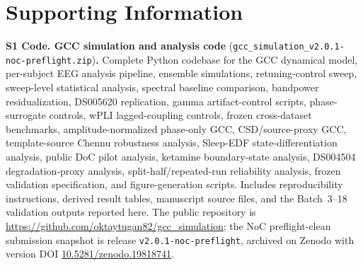 \documentclass[11pt,a4paper]{article}
\theoremstyle{plain}
\theoremstyle{definition}
\theoremstyle{remark}
\begin{document}

\section*{Supporting Information}

\noindent\textbf{S1 Code. GCC simulation and analysis code} (\texttt{gcc\_simulation\_v2.0.1-noc-preflight.zip})\textbf{.} Complete Python codebase for the GCC dynamical model, per-subject EEG analysis pipeline, ensemble simulations, retuning-control sweep, sweep-level statistical analysis, spectral baseline comparison, bandpower residualization, DS005620 replication, gamma artifact-control scripts, phase-surrogate controls, wPLI lagged-coupling controls, frozen cross-dataset benchmarks, amplitude-normalized phase-only GCC, CSD/source-proxy GCC, template-source Chennu robustness analysis, Sleep-EDF state-differentiation analysis, public DoC pilot analysis, ketamine boundary-state analysis, DS004504 degradation-proxy analysis, split-half/repeated-run reliability analysis, frozen validation specification, and figure-generation scripts. Includes reproducibility instructions, derived result tables, manuscript source files, and the Batch~3--18 validation outputs reported here. The public repository is \url{https://github.com/oktaytugan82/gcc_simulation}; the NoC preflight-clean submission snapshot is release \texttt{v2.0.1-noc-preflight}, archived on Zenodo with version DOI \href{https://doi.org/10.5281/zenodo.19818741}{10.5281/zenodo.19818741}.
\end{document}
